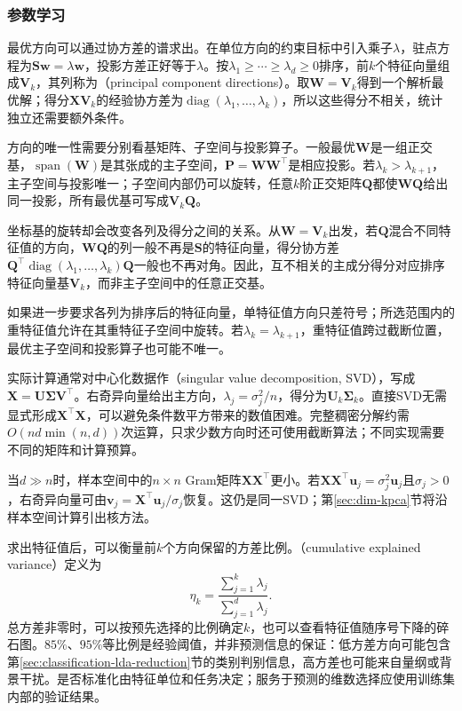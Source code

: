 \subsubsection{参数学习}
\label{sec:dim-pca-learning}

最优方向可以通过协方差的谱求出。在单位方向的约束目标中引入乘子$\lambda$，驻点方程为$\bm{S}\bm{w}=\lambda\bm{w}$，投影方差正好等于$\lambda$。按$\lambda_1\geq\cdots\geq\lambda_d\geq0$排序，前$k$个特征向量组成$\bm{V}_k$，其列称为（principal component directions）。取$\bm{W}=\bm{V}_k$得到一个解析最优解；得分$\bm{X}\bm{V}_k$的经验协方差为$\operatorname{diag}(\lambda_1,\ldots,\lambda_k)$，所以这些得分不相关，统计独立还需要额外条件。

方向的唯一性需要分别看基矩阵、子空间与投影算子。一般最优$\bm{W}$是一组正交基，$\operatorname{span}(\bm{W})$是其张成的主子空间，$\bm{P}=\bm{W}\bm{W}^{\top}$是相应投影。若$\lambda_k>\lambda_{k+1}$，主子空间与投影唯一；子空间内部仍可以旋转，任意$k$阶正交矩阵$\bm{Q}$都使$\bm{W}\bm{Q}$给出同一投影，所有最优基可写成$\bm{V}_k\bm{Q}$。

坐标基的旋转却会改变各列及得分之间的关系。从$\bm{W}=\bm{V}_k$出发，若$\bm{Q}$混合不同特征值的方向，$\bm{W}\bm{Q}$的列一般不再是$\bm{S}$的特征向量，得分协方差$\bm{Q}^{\top}\operatorname{diag}(\lambda_1,\ldots,\lambda_k)\bm{Q}$一般也不再对角。因此，互不相关的主成分得分对应排序特征向量基$\bm{V}_k$，而非主子空间中的任意正交基。

如果进一步要求各列为排序后的特征向量，单特征值方向只差符号；所选范围内的重特征值允许在其重特征子空间中旋转。若$\lambda_k=\lambda_{k+1}$，重特征值跨过截断位置，最优主子空间和投影算子也可能不唯一。

实际计算通常对中心化数据作（singular value decomposition, SVD），写成$\bm{X}=\bm{U}\bm{\Sigma}\bm{V}^{\top}$。右奇异向量给出主方向，$\lambda_j=\sigma_j^2/n$，得分为$\bm{U}_k\bm{\Sigma}_k$。直接SVD无需显式形成$\bm{X}^{\top}\bm{X}$，可以避免条件数平方带来的数值困难。完整稠密分解约需$O(nd\min(n,d))$次运算，只求少数方向时还可使用截断算法；不同实现需要不同的矩阵和计算预算。

当$d\gg n$时，样本空间中的$n\times n$ Gram矩阵$\bm{X}\bm{X}^{\top}$更小。若$\bm{X}\bm{X}^{\top}\bm{u}_j=\sigma_j^2\bm{u}_j$且$\sigma_j>0$，右奇异向量可由$\bm{v}_j=\bm{X}^{\top}\bm{u}_j/\sigma_j$恢复。这仍是同一SVD；第\ref{sec:dim-kpca}节将沿样本空间计算引出核方法。

求出特征值后，可以衡量前$k$个方向保留的方差比例。（cumulative explained variance）定义为
\begin{equation}
  \eta_k=\frac{\sum_{j=1}^{k}\lambda_j}
                    {\sum_{j=1}^{d}\lambda_j}.
  \label{eq:dim-explained-variance}
\end{equation}
总方差非零时，可以按预先选择的比例确定$k$，也可以查看特征值随序号下降的碎石图。$85\%$、$95\%$等比例是经验阈值，并非预测信息的保证：低方差方向可能包含第\ref{sec:classification-lda-reduction}节的类别判别信息，高方差也可能来自量纲或背景干扰。是否标准化由特征单位和任务决定；服务于预测的维数选择应使用训练集内部的验证结果。

